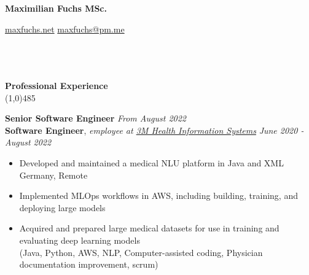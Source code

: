 \documentclass[9pt]{extarticle}
\newcommand\negativespace[1][-0.12cm]{\hspace*{#1}}
\begin{document}
\centerline{{\LARGE \bf Maximilian Fuchs MSc.}}
\centerline{\small \href{https://maxfuchs.net}{maxfuchs.net} \raisebox{0.25ex}{\tiny$\bullet$}  \href{mailto:maxfuchs@pm.me}{maxfuchs@pm.me}}


\noindent %
\\\\\\
\vspace*{-6pt}
{\negativespace \Large \bf Professional Experience}\\
\line(1,0){485}
\\
\noindent

\noindent
{\bf Senior Software Engineer}  \hfill \textit{From August 2022} \\
{\bf Software Engineer}, \textit{employee at \href{https://www.3m.com/3M/en_US/health-information-systems-us/support/international/}{3M Health Information Systems}}  \hfill \textit{June 2020 - August 2022} 
\begin{itemize}
\setlength\itemsep{0.05em}
\item Developed and maintained a medical NLU platform in Java and XML \hfill Germany, Remote 
\item Implemented MLOps workflows in AWS, including building, training, and deploying large models
\item Acquired and prepared large medical datasets for use in training and evaluating deep learning models \\
(Java, Python, AWS, NLP, Computer-assisted coding, Physician documentation improvement, scrum) \\
\end{itemize}
\end{document}
